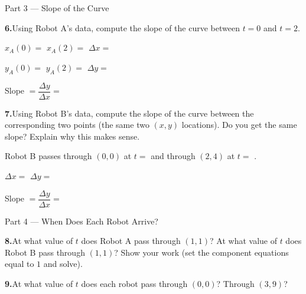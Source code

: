 \documentclass[10pt]{article}
\begin{document}
\vspace{0.08in}

\begin{notesbox}{Part 3 --- Slope of the Curve}

\textbf{6.}\quad Using Robot A's data, compute the slope of the curve
between $t = 0$ and $t = 2$.

\vspace{4pt}
$x_A(0) = $ \blank{1.5cm} \qquad $x_A(2) = $ \blank{1.5cm} \qquad $\Delta x = $ \blank{1.5cm}

$y_A(0) = $ \blank{1.5cm} \qquad $y_A(2) = $ \blank{1.5cm} \qquad $\Delta y = $ \blank{1.5cm}

\vspace{4pt}
Slope $= \dfrac{\Delta y}{\Delta x} = $ \blank{2.5cm}

\vspace{10pt}
\textbf{7.}\quad Using Robot B's data, compute the slope of the curve
between the corresponding two points (the same two $(x,y)$ locations).
Do you get the same slope? Explain why this makes sense.

\vspace{4pt}
Robot B passes through $(0, 0)$ at $t = $ \blank{1.2cm}
and through $(2, 4)$ at $t = $ \blank{1.2cm}.

$\Delta x = $ \blank{1.5cm} \qquad $\Delta y = $ \blank{1.5cm}

\vspace{4pt}
Slope $= \dfrac{\Delta y}{\Delta x} = $ \blank{2.5cm}


\end{notesbox}

\vspace{0.08in}

\begin{notesbox}{Part 4 --- When Does Each Robot Arrive?}

\textbf{8.}\quad At what value of $t$ does Robot A pass through $(1, 1)$?
At what value of $t$ does Robot B pass through $(1, 1)$?
Show your work (set the component equations equal to $1$ and solve).


\textbf{9.}\quad At what value of $t$ does each robot pass through
$(0, 0)$? Through $(3, 9)$?


\end{notesbox}
\end{document}
